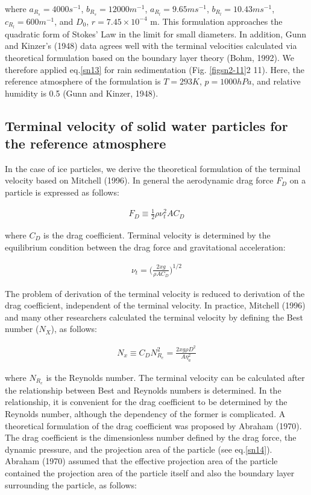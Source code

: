 where $a_{R_{s}}= 4000 s^{-1}$, $b_{R_{s}}=12000 m^{-1}$, $a_{R_{l}}=9.65 m s^{-1}$, $b_{R_{l}} = 10.43 m s^{-1}$, $c_{R_{l}} = 600 m^{-1}$, and $D_{0}$, $r=7.45\times10^{-4}$ m. This formulation approaches the quadratic form of Stokes’ Law in the limit for small diameters. In addition, Gunn and Kinzer’s (1948) data agrees well with the terminal velocities calculated via theoretical formulation based on the boundary layer theory (Bohm, 1992). We therefore applied eq.\ref{sn13} for rain sedimentation (Fig. \ref{figsn2-11}2 11). Here, the reference atmosphere of the formulation is $T = 293 K$, $p = 1000hPa$, and relative humidity is 0.5 (Gunn and Kinzer, 1948).

\subsection{Terminal velocity of solid water particles for the reference atmosphere}
In the case of ice particles, we derive the theoretical formulation of the terminal velocity based on Mitchell (1996). In general the aerodynamic drag force $F_{D}$ on a particle is expressed as follows:

\begin{eqnarray}
F_{D}\equiv \frac{1}{2}\rho\nu_{t}^{2}AC_{D}
\label{sn14}
\end{eqnarray}

where $C_{D}$ is the drag coefficient. Terminal velocity is determined by the equilibrium condition between the drag force and gravitational acceleration:

\begin{eqnarray}
\nu_{t}=\bigl(\frac{2xg}{\rho AC_{D}}\bigr)^{1/2}
\label{sn15}
\end{eqnarray}

The problem of derivation of the terminal velocity is reduced to derivation of the drag coefficient, independent of the terminal velocity. In practice, Mitchell (1996) and many other researchers calculated the terminal velocity by defining the Best number ($N_{X}$), as follows:

\begin{eqnarray}
N_{x}\equiv C_{D}N_{R_{e}}^{2}=\frac{2xg\rho D^{2}}{A\eta_{a}^{2}}
\label{sn16}
\end{eqnarray}

where $N_{R_{e}}$ is the Reynolds number. The terminal velocity can be calculated after the relationship between Best and Reynolds numbers is determined. In the relationship, it is convenient for the drag coefficient to be determined by the Reynolds number, although the dependency of the former is complicated. A theoretical formulation of the drag coefficient was proposed by Abraham (1970). The drag coefficient is the dimensionless number defined by the drag force, the dynamic pressure, and the projection area of the particle (see eq.\ref{sn14}). Abraham (1970) assumed that the effective projection area of the particle contained the projection area of the particle itself and also the boundary layer surrounding the particle, as follows:


